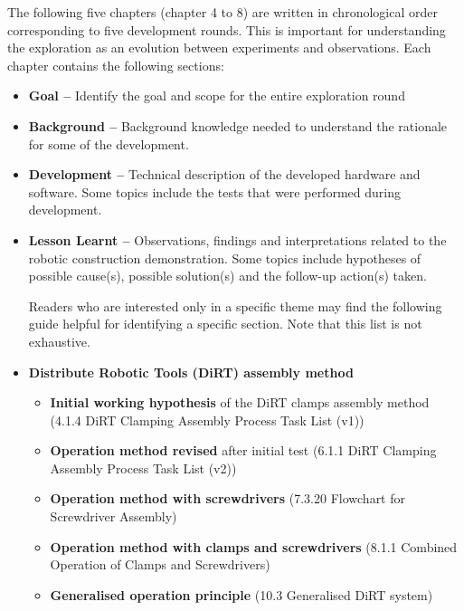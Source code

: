 The following five chapters (chapter 4 to 8) are written in chronological order corresponding to five development rounds. This is important for understanding the exploration as an evolution between experiments and observations.  Each chapter contains the following sections:

\begin{itemize}
	\item \textbf{Goal --} Identify the goal and scope for the entire exploration round

	\item \textbf{Background --} Background knowledge needed to understand the rationale for some of the development.

	\item \textbf{Development --} Technical description of the developed hardware and software. Some topics include the tests that were performed during development.

	\item \textbf{Lesson Learnt --} Observations, findings and interpretations related to the robotic construction demonstration. Some topics include hypotheses of possible cause(s), possible solution(s) and the follow-up action(s) taken. 

Readers who are interested only in a specific theme may find the following guide helpful for identifying a specific section. Note that this list is not exhaustive. 

	\item \textbf{Distribute Robotic Tools (DiRT) assembly method}

\begin{itemize}
	\item \textbf{Initial working hypothesis} of the DiRT clamps assembly method (4.1.4 DiRT Clamping Assembly Process Task List (v1))

	\item \textbf{Operation method revised} after initial test (6.1.1 DiRT Clamping Assembly Process Task List (v2))

	\item \textbf{Operation method with screwdrivers} (7.3.20 Flowchart for Screwdriver Assembly)

	\item \textbf{Operation method with clamps and screwdrivers }(8.1.1 Combined Operation of Clamps and Screwdrivers)

	\item \textbf{Generalised operation principle} (10.3 Generalised DiRT system)


\end{itemize}
\end{itemize}
